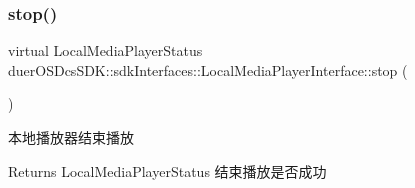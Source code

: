 \subsubsection{\texorpdfstring{stop()}{stop()}}
{\footnotesize\ttfamily virtual Local\+Media\+Player\+Status duer\+O\+S\+Dcs\+S\+D\+K\+::sdk\+Interfaces\+::\+Local\+Media\+Player\+Interface\+::stop (\begin{DoxyParamCaption}{ }\end{DoxyParamCaption})\hspace{0.3cm}{\ttfamily [pure virtual]}}



本地播放器结束播放 

\begin{DoxyReturn}{Returns}
Local\+Media\+Player\+Status 结束播放是否成功 
\end{DoxyReturn}
